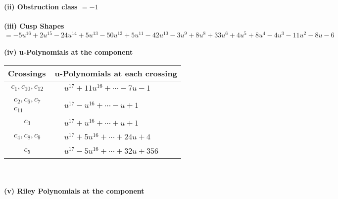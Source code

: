 \documentclass[1p]{elsarticle_modified}
\theoremstyle{definition}
\begin{document}
\flushleft \textbf{(ii) Obstruction class $= -1$}\\~\\
\flushleft \textbf{(iii) Cusp Shapes $= -5 u^{16}+2 u^{15}-24 u^{14}+5 u^{13}-50 u^{12}+5 u^{11}-42 u^{10}-3 u^9+8 u^8+33 u^6+4 u^5+8 u^4-4 u^3-11 u^2-8 u-6$}\\~\\
\newpage\renewcommand{\arraystretch}{1}
\flushleft \textbf{(iv) u-Polynomials at the component}\newline \\
\begin{tabular}{m{50pt}|m{274pt}}
Crossings & \hspace{64pt}u-Polynomials at each crossing \\
\hline $$\begin{aligned}c_{1},c_{10},c_{12}\end{aligned}$$&$\begin{aligned}
&u^{17}+11 u^{16}+\cdots-7 u-1
\end{aligned}$\\
\hline $$\begin{aligned}c_{2},c_{6},c_{7}\\c_{11}\end{aligned}$$&$\begin{aligned}
&u^{17}- u^{16}+\cdots- u+1
\end{aligned}$\\
\hline $$\begin{aligned}c_{3}\end{aligned}$$&$\begin{aligned}
&u^{17}+u^{16}+\cdots+u+1
\end{aligned}$\\
\hline $$\begin{aligned}c_{4},c_{8},c_{9}\end{aligned}$$&$\begin{aligned}
&u^{17}+5 u^{16}+\cdots+24 u+4
\end{aligned}$\\
\hline $$\begin{aligned}c_{5}\end{aligned}$$&$\begin{aligned}
&u^{17}-5 u^{16}+\cdots+32 u+356
\end{aligned}$\\
\hline
\end{tabular}\\~\\
\newpage\renewcommand{\arraystretch}{1}
\flushleft \textbf{(v) Riley Polynomials at the component}\newline \\
\end{document}
